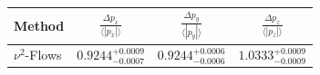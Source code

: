    \begin{tabular}{lccc}
        \toprule
        Method & $\frac{\Delta p_x}{\langle |p_x|\rangle}$ & $\frac{\Delta p_y}{\langle |p_y|\rangle}$ & $\frac{\Delta p_z}{\langle |p_z|\rangle}$ \\
        \midrule
        $\nu^2$-Flows & $0.9244^{+0.0009}_{-0.0007}$ & $0.9244^{+0.0006}_{-0.0006}$ & $1.0333^{+0.0009}_{-0.0009}$ \\
        \bottomrule
    \end{tabular}